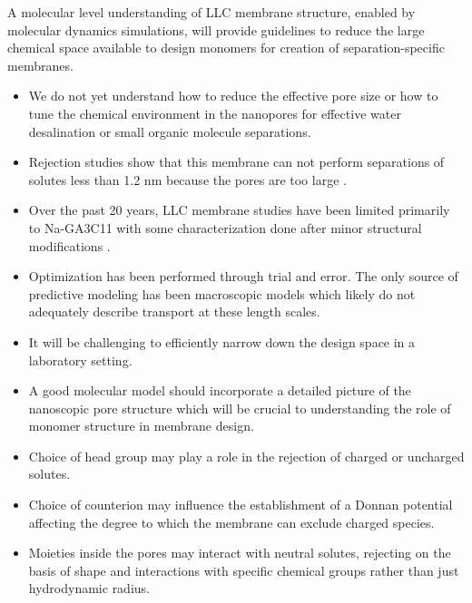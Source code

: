 \documentclass{article}
\begin{document}
  A molecular level understanding of LLC membrane structure, enabled by molecular
  dynamics simulations, will provide guidelines to reduce the large chemical space
  available to design monomers for creation of separation-specific membranes.
  \begin{itemize}
    \item  We do not yet understand how to reduce the effective pore size or 
    how to tune the chemical environment in the nanopores for effective water
    desalination or small organic molecule separations.
    \item Rejection studies show that this membrane can not perform separations of
    solutes less than 1.2 nm because the pores are too large \cite{zhou_supported_2005}.
    \item Over the past 20 years, LLC membrane studies have been limited primarily 
    to Na-GA3C11 with some characterization done after minor structural modifications
    \cite{resel_structural_2000}. 
    \item Optimization has been performed through trial and error. The only source of 
    predictive modeling has been macroscopic models which likely do not adequately describe 
    transport at these length scales. %
    \item It will be challenging to efficiently narrow down the design space in 
    a laboratory setting.
    \item A good molecular model should incorporate a detailed picture of the nanoscopic pore 
    structure which will be crucial to understanding the role of monomer structure in 
    membrane design.
    \item Choice of head group may play a role in the rejection of charged or uncharged solutes.
    \item Choice of counterion may influence the establishment of a Donnan potential 
    affecting the degree to which the membrane can exclude charged species.
    \item Moieties inside the pores may interact with neutral solutes, rejecting
    on the basis of shape and 
    interactions with specific chemical groups
rather than just hydrodynamic radius.
  \end{itemize}
  
\end{document}
